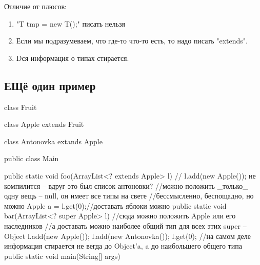 Отличие от плюсов:
\begin{enumerate}
	\item
		\java"T tmp = new T();" писать нельзя
	\item
		Если мы подразумеваем, что где-то что-то есть, то надо писать \java"extends".
	\item
		Dся информация о типах стирается.
\end{enumerate}

\subsection{ЕЩё один пример}
\begin{javacode}
class Fruit {}

class Apple extends Fruit{}

class Antonovka extands Apple {}

public class Main {
	public static void foo(ArrayList<? extends Apple> l) {
//		l.add(new Apple()); не компилится -- вдруг это был список антоновки?
//можно положить _только_ одну вещь -- null, он имеет все типы на свете
//бессмысленно, беспощадно, но можно
		Apple a = l.get(0);//доставать яблоки можно
	}
	public static void bar(ArrayList<? super Apple> l) {
//сюда можно положить Apple или его наследников
//а доставать можно наиболее общий тип для всех этих super -- Object
		l.add(new Apple());
		l.add(new Antonovka());
		l.get(0);
//на самом деле информация стирается не вегда до Object'a, a до наибольшего общего типа
	}
	public static void main(String[] args) {
	
	}
}
\end{javacode}
